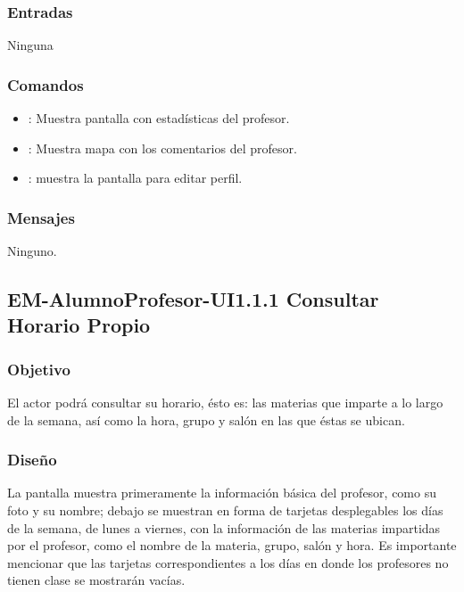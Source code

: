\subsubsection{Entradas}

Ninguna

\subsubsection{Comandos}
\begin{itemize}
	\item {}: Muestra pantalla con estadísticas del profesor.
	\item {}: Muestra mapa con los comentarios del profesor.
	\item {}: muestra la pantalla para editar perfil.
\end{itemize}

\subsubsection{Mensajes}
\begin{Citemize}
	\item Ninguno.
\end{Citemize}

\subsection{EM-AlumnoProfesor-UI1.1.1 Consultar Horario Propio}

\subsubsection{Objetivo}
	\noindent
	El actor podrá consultar su horario, ésto es: las materias que imparte a lo largo de la semana, así como la hora, grupo y salón en las que éstas se ubican.


\subsubsection{Diseño}
	\noindent
	La pantalla muestra primeramente la información básica del profesor, como su foto y su nombre; debajo se muestran en forma de tarjetas desplegables los días de la semana, de lunes a viernes, con la información de las materias impartidas por el profesor, como el nombre de la materia, grupo, salón y hora. Es importante mencionar que las tarjetas correspondientes a los días en donde los profesores no tienen clase se mostrarán vacías.

